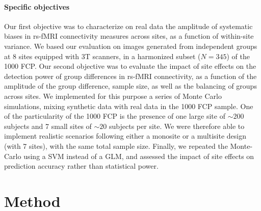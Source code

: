 \documentclass[authoryear]{elsarticle}
\begin{document}
\paragraph{Specific objectives}
Our first objective was to characterize on real data the amplitude of systematic biases in rs-fMRI connectivity measures across sites, as a function of within-site variance. We based our evaluation on images generated from independent groups at 8 sites equipped with 3T scanners, in a harmonized subset ($N=345$) of the 1000 FCP. Our second objective was to evaluate the impact of site effects on the detection power of group differences in rs-fMRI connectivity, as a function of the amplitude of the group difference, sample size, as well as the balancing of groups across sites. We implemented for this purpose a series of Monte Carlo simulations, mixing synthetic data with real data in the 1000 FCP sample. One of the particularity of the 1000 FCP is the presence of one large site of $\sim200$ subjects and 7 small sites of $\sim20$ subjects per site. We were therefore able to implement realistic scenarios following either a monosite or a multisite design (with 7 sites), with the same total sample size. Finally, we repeated the Monte-Carlo using a SVM instead of a GLM, and assessed the impact of site effects on prediction accuracy rather than statistical power.

\section{Method}
\end{document}
